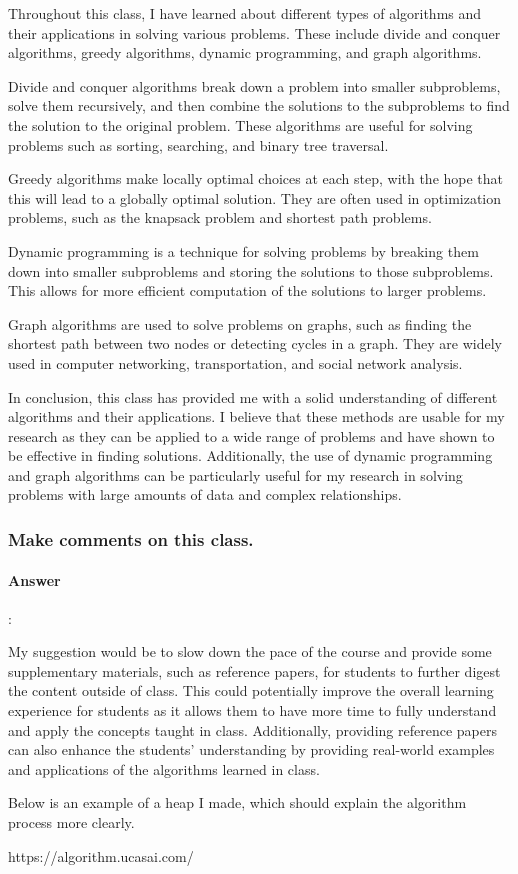 \documentclass{article}
\begin{document}
Throughout this class, I have learned about different types of algorithms and their applications in solving various problems. These include divide and conquer algorithms, greedy algorithms, dynamic programming, and graph algorithms.

Divide and conquer algorithms break down a problem into smaller subproblems, solve them recursively, and then combine the solutions to the subproblems to find the solution to the original problem. These algorithms are useful for solving problems such as sorting, searching, and binary tree traversal.

Greedy algorithms make locally optimal choices at each step, with the hope that this will lead to a globally optimal solution. They are often used in optimization problems, such as the knapsack problem and shortest path problems.

Dynamic programming is a technique for solving problems by breaking them down into smaller subproblems and storing the solutions to those subproblems. This allows for more efficient computation of the solutions to larger problems.

Graph algorithms are used to solve problems on graphs, such as finding the shortest path between two nodes or detecting cycles in a graph. They are widely used in computer networking, transportation, and social network analysis.

In conclusion, this class has provided me with a solid understanding of different algorithms and their applications. I believe that these methods are usable for my research as they can be applied to a wide range of problems and have shown to be effective in finding solutions. Additionally, the use of dynamic programming and graph algorithms can be particularly useful for my research in solving problems with large amounts of data and complex relationships.

\subsubsection{Make comments on this class.}

\paragraph{Answer}:

My suggestion would be to slow down the pace of the course and provide some supplementary materials, such as reference papers, for students to further digest the content outside of class. This could potentially improve the overall learning experience for students as it allows them to have more time to fully understand and apply the concepts taught in class. Additionally, providing reference papers can also enhance the students' understanding by providing real-world examples and applications of the algorithms learned in class.

Below is an example of a heap I made, which should explain the algorithm process more clearly.

https://algorithm.ucasai.com/
\end{document}
